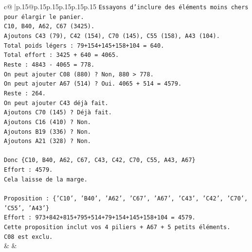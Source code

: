 \documentclass{article}
\begin{document}
{\begin{supertabular}{c@{$\;$}|p{.15\linewidth}@{}p{.15\linewidth}p{.15\linewidth}p{.15\linewidth}p{.15\linewidth}p{.15\linewidth}}
{{{\texttt{Essayons d'inclure des éléments moins chers pour élargir le panier.} \\
\texttt{C10, B40, A62, C67 (3425).} \\
\texttt{Ajoutons C43 (79), C42 (154), C70 (145), C55 (158), A43 (104).} \\
\texttt{Total poids légers : 79+154+145+158+104 = 640.} \\
\texttt{Total effort : 3425 + 640 = 4065.} \\
\texttt{Reste : 4843 {-} 4065 = 778.} \\
\texttt{On peut ajouter C08 (880) ? Non, 880 > 778.} \\
\texttt{On peut ajouter A67 (514) ? Oui. 4065 + 514 = 4579.} \\
\texttt{Reste : 264.} \\
\texttt{On peut ajouter C43 déjà fait.} \\
\texttt{Ajoutons C70 (145) ? Déjà fait.} \\
\texttt{Ajoutons C16 (410) ? Non.} \\
\texttt{Ajoutons B19 (336) ? Non.} \\
\texttt{Ajoutons A21 (328) ? Non.} \\
\\ 
\texttt{Donc \{C10, B40, A62, C67, C43, C42, C70, C55, A43, A67\}} \\
\texttt{Effort : 4579.} \\
\texttt{Cela laisse de la marge.} \\
\\ 
\texttt{Proposition : \{'C10', 'B40', 'A62', 'C67', 'A67', 'C43', 'C42', 'C70', 'C55', 'A43'\}} \\
\texttt{Effort : 973+842+815+795+514+79+154+145+158+104 = 4579.} \\
\texttt{Cette proposition inclut vos 4 piliers + A67 + 5 petits éléments.} \\
\texttt{C08 est exclu.} \\
            }
        }
    }
    & & \\ \\


\end{supertabular}}
\end{document}
